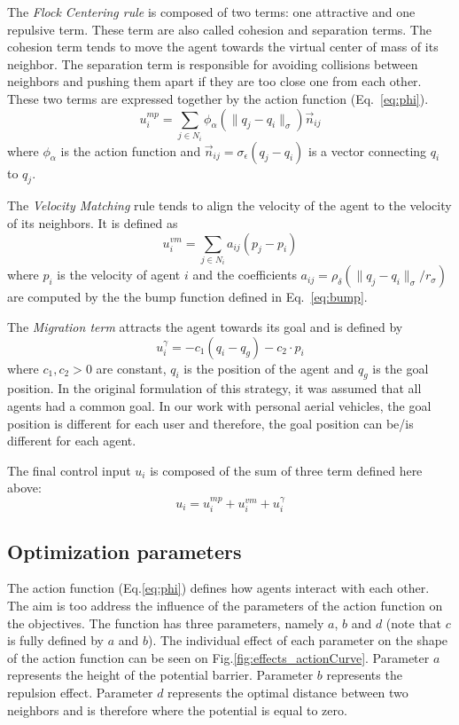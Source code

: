 The \emph{Flock Centering rule} is composed of two terms: one attractive and one repulsive term. These term are also called cohesion and separation terms. The cohesion term tends to move the agent towards the virtual center of mass of its neighbor. The separation term is responsible for avoiding collisions between neighbors and pushing them apart if they are too close one from each other.  These two terms are expressed together by the action function (Eq.~\ref{eq:phi}).
\begin{equation}
u_i^{mp}=\sum_{j\in N_i}{\phi_{\alpha}(\|q_j-q_i\|_{\sigma})}\vec{n}_{ij}
\label{eq:motionplanning}
\end{equation}
where $\phi_{\alpha}$ is the action function and $\vec{n}_{ij}=\sigma_{\epsilon}(q_j-q_i)$ is a vector connecting $q_i$ to $q_j$. 

The \emph{Velocity Matching} rule tends to align the velocity of the agent to the velocity of its neighbors. It is defined as 
\begin{equation}
u_i^{vm}=\sum_{j\in N_i}{a_{ij}(p_j-p_i)}
\label{eq:velocitymatching}
\end{equation}
where $p_i$ is the velocity of agent $i$ and the coefficients $a_{ij}=\rho_{\delta}(\|q_j-q_i\|_{\sigma}/r_{\sigma})$ are computed by the the bump function defined in Eq.~\ref{eq:bump}.


The \emph{Migration term} attracts the agent towards its goal and is defined by
\begin{equation}
u_i^{\gamma}=-c_1(q_i-q_g)-c_2\cdot p_i
\label{eq:migration}
\end{equation}  
where $c_1,c_2>0$ are constant, $q_i$ is the position of the agent and $q_g$ is the goal position. In the original formulation of this strategy, it was assumed that all agents had a common goal. In our work with personal aerial vehicles, the goal position is different for each user and therefore, the goal position can be/is different for each agent. 

The final control input $u_i$ is composed of the sum of three term defined here above:
\begin{equation}
u_i=u_i^{mp}+u_i^{vm}+u_i^{\gamma}
\label{eq:input}
\end{equation}

\subsection{Optimization parameters}

The action function (Eq.\ref{eq:phi}) defines how agents interact with each other. The aim is too address the influence of the parameters of the action function on the objectives. The function has three parameters, namely $a$, $b$ and $d$ (note that $c$ is fully defined by $a$ and $b$). The individual effect of each parameter on the shape of the action function can be seen on Fig.\ref{fig:effects_actionCurve}. Parameter $a$ represents the height of the potential barrier. Parameter $b$ represents the repulsion effect. Parameter $d$ represents the optimal distance between two neighbors and is therefore where the potential is equal to zero. 

